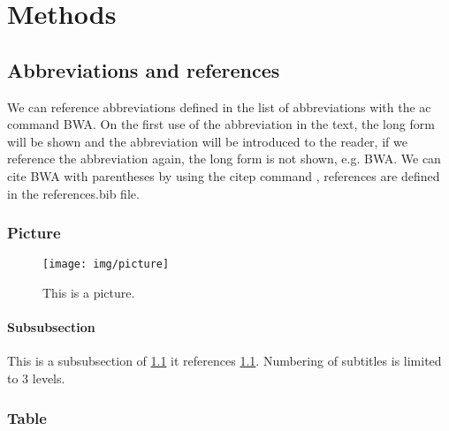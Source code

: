 \chapter{Methods}
\label{chap:methods}

\section{Abbreviations and references}
\label{sec:methods_bwa}
We can reference abbreviations defined in the list of abbreviations with the ac command \ac{BWA}. On the first use of the abbreviation in the text, the long form will be shown and the abbreviation will be introduced to the reader, if we reference the abbreviation again, the long form is not shown, e.g. \ac{BWA}. We can cite \ac{BWA} with parentheses by using the citep command \citep{10.1093/bioinformatics/btp324}, references are defined in the references.bib file.

\subsection{Picture}

\begin{figure}
    \centering
    \texttt{[image: img/picture]}
    \caption{This is a picture.}
    \label{fig:example}
\end{figure}

\subsubsection{Subsubsection}
This is a subsubsection of \cref{sec:methods_bwa} it references \cref{fig:example}. Numbering of subtitles is limited to 3 levels.

\subsection{Table}

